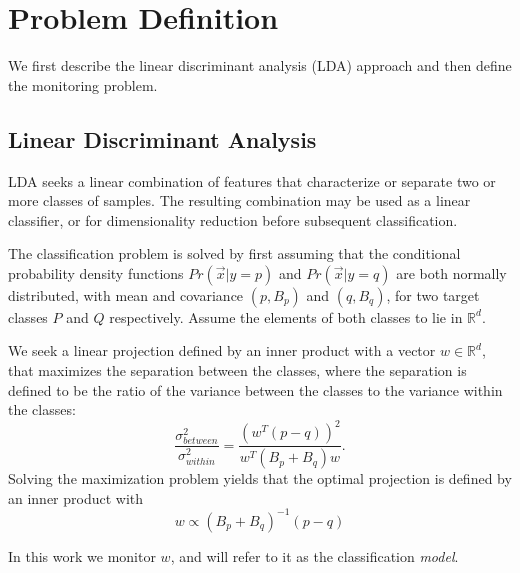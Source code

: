 \section{Problem Definition}
We first describe the linear discriminant analysis (LDA) approach and then define the monitoring problem. 

\subsection{Linear Discriminant Analysis}%
LDA seeks a linear combination of features that characterize or separate two or more classes of samples.
The resulting combination may be used as a linear classifier, or for dimensionality reduction before subsequent classification.

The classification problem is solved by first assuming that the conditional probability
density functions $Pr(\vec x|y=p)$ and $Pr(\vec x|y=q)$ are both normally distributed, with
mean and covariance  $(p, B_p)$ and
$(q, B_q)$, for two target classes $P$ and $Q$ respectively. Assume
the elements of both classes to lie in $\mathbb{R}^d$.

We seek a linear projection defined by an inner product with a vector $w \in \mathbb{R}^d $,
that maximizes the separation between the classes, where the separation is
defined to be the ratio of the variance between the classes to the variance
within the classes:
\begin{equation}
\frac{\sigma^2_{between}}{\sigma^2_{within}} = \frac{(w^T (p -
q))^2}{w^T(B_p+B_q)w}.
\end{equation}
Solving the maximization problem yields that the optimal projection is defined by an inner product
with 
%
\begin{equation} \label{eq:w}
w \propto (B_p+B_q)^{-1}(p - q)
\end{equation}

In this work we monitor $w$, and will refer to it as the classification \textit{model}.

